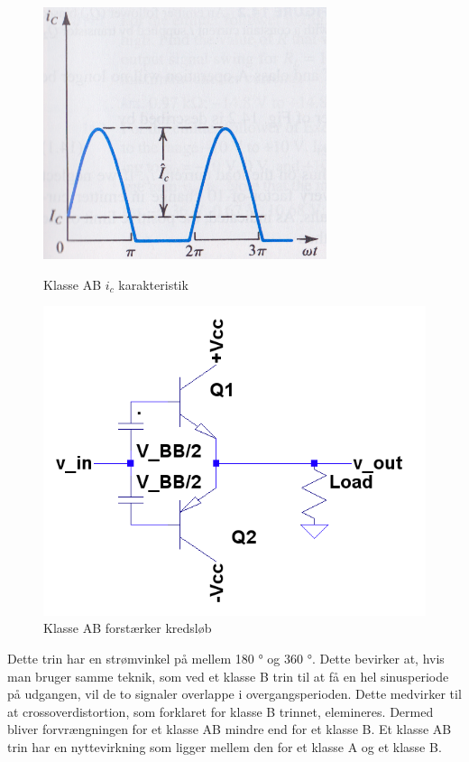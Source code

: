 \begin{figure}[ht]
\begin{minipage}[b]{0.5\linewidth}
\centering
\includegraphics[scale=.35]{indledende_analyse/klasser/klasseab.png}
\caption{Klasse AB $i_c$ karakteristik}
\label{fig:klasseab}
\end{minipage}
\hspace{0.5cm}
\begin{minipage}[b]{0.5\linewidth}
\centering
\includegraphics[scale=.35]{indledende_analyse/klasser/classab.png}
\caption{Klasse AB forstærker kredsløb}
\label{fig:classab}
\end{minipage}
\end{figure}


Dette trin har en strømvinkel på mellem 180 ° og 360 °. Dette bevirker at, hvis man bruger samme teknik, som ved et klasse B trin til at få en hel sinusperiode på udgangen, vil de to signaler overlappe i overgangsperioden. Dette medvirker til at crossoverdistortion, som forklaret for klasse B trinnet, elemineres. Dermed bliver forvrængningen for et klasse AB mindre end for et klasse B.
Et klasse AB trin har en nyttevirkning som ligger mellem den for et klasse A og et klasse B. 

